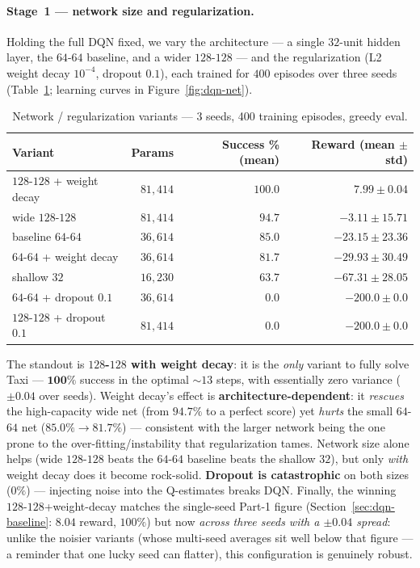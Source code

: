 \documentclass[11pt]{article}
\begin{document}
\paragraph{Stage~1 --- network size and regularization.}
Holding the full DQN fixed, we vary the architecture --- a single $32$-unit hidden layer, the
$64$\nobreakdash-$64$ baseline, and a wider $128$\nobreakdash-$128$ --- and the regularization
(L2 weight decay $10^{-4}$, dropout $0.1$), each trained for $400$ episodes over three seeds
(Table~\ref{tab:dqn-net}; learning curves in Figure~\ref{fig:dqn-net}).

\begin{table}[h]
\centering
\begin{tabular}{@{}lrrr@{}}
\toprule
\textbf{Variant} & \textbf{Params} & \textbf{Success \% (mean)} & \textbf{Reward (mean $\pm$ std)} \\
\midrule
$128$-$128$ + weight decay & $81{,}414$ & $\mathbf{100.0}$ & $\mathbf{7.99 \pm 0.04}$ \\
wide $128$-$128$           & $81{,}414$ & $94.7$ & $-3.11 \pm 15.71$ \\
baseline $64$-$64$         & $36{,}614$ & $85.0$ & $-23.15 \pm 23.36$ \\
$64$-$64$ + weight decay   & $36{,}614$ & $81.7$ & $-29.93 \pm 30.49$ \\
shallow $32$               & $16{,}230$ & $63.7$ & $-67.31 \pm 28.05$ \\
$64$-$64$ + dropout $0.1$  & $36{,}614$ & $0.0$  & $-200.0 \pm 0.0$ \\
$128$-$128$ + dropout $0.1$& $81{,}414$ & $0.0$  & $-200.0 \pm 0.0$ \\
\bottomrule
\end{tabular}
\caption{Network / regularization variants --- 3 seeds, 400 training episodes, greedy eval.}
\label{tab:dqn-net}
\end{table}

\noindent The standout is \textbf{$128$-$128$ with weight decay}: it is the \emph{only} variant to
fully solve Taxi --- $\mathbf{100\%}$ success in the optimal ${\sim}13$ steps, with essentially zero
variance ($\pm 0.04$ over seeds). Weight decay's effect is \textbf{architecture-dependent}: it
\emph{rescues} the high-capacity wide net (from $94.7\%$ to a perfect score) yet \emph{hurts} the
small $64$-$64$ net ($85.0\% \to 81.7\%$) --- consistent with the larger network being the one
prone to the over-fitting/instability that regularization tames. Network size alone helps (wide
$128$-$128$ beats the $64$-$64$ baseline beats the shallow $32$), but only \emph{with} weight decay
does it become rock-solid. \textbf{Dropout is catastrophic} on both sizes ($0\%$) --- injecting
noise into the Q-estimates breaks DQN. Finally, the winning $128$-$128$+weight-decay matches the
single-seed Part-1 figure (Section~\ref{sec:dqn-baseline}: $8.04$ reward, $100\%$) but now
\emph{across three seeds with a $\pm0.04$ spread}: unlike the noisier variants (whose multi-seed
averages sit well below that figure --- a reminder that one lucky seed can flatter), this
configuration is genuinely robust.
\end{document}
